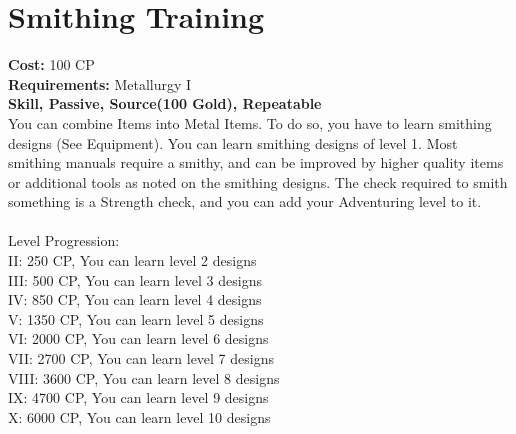 \section{Smithing Training}
\textbf{Cost:} 100 CP\\
\textbf{Requirements:} Metallurgy I\\
\textbf{Skill, Passive, Source(100 Gold), Repeatable}\\
You can combine Items into Metal Items. To do so, you have to learn smithing designs (See Equipment). You can learn smithing designs of level 1. Most smithing manuals require a smithy, and can be improved by higher quality items or additional tools as noted on the smithing designs. The check required to smith something is a Strength check, and you can add your Adventuring level to it.\\
\\
Level Progression:\\
II: 250 CP, You can learn level 2 designs\\
III: 500 CP, You can learn level 3 designs\\
IV: 850 CP, You can learn level 4 designs\\
V: 1350 CP, You can learn level 5 designs\\
VI: 2000 CP, You can learn level 6 designs\\
VII: 2700 CP, You can learn level 7 designs\\
VIII: 3600 CP, You can learn level 8 designs\\
IX: 4700 CP, You can learn level 9 designs\\
X: 6000 CP, You can learn level 10 designs\\